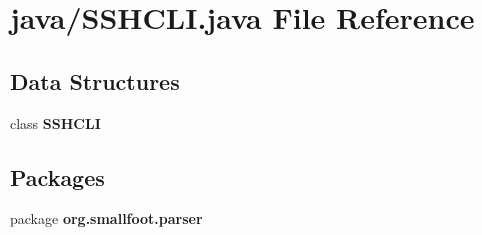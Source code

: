 \section{java/\+S\+S\+H\+C\+L\+I.java File Reference}
\label{SSHCLI_8java}
\subsection*{Data Structures}
\begin{DoxyCompactItemize}
\item 
class {\bf S\+S\+H\+C\+L\+I}
\end{DoxyCompactItemize}
\subsection*{Packages}
\begin{DoxyCompactItemize}
\item 
package {\bf org.\+smallfoot.\+parser}
\end{DoxyCompactItemize}
